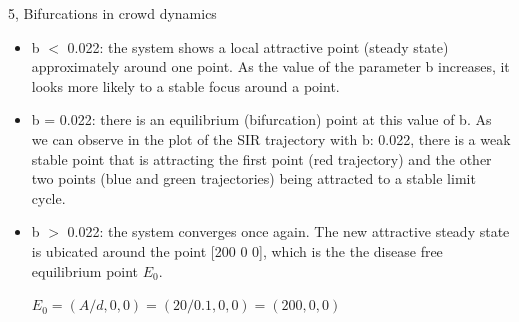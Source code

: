\documentclass[10pt,a4paper]{article}
\begin{document}
\begin{task}{5, Bifurcations in crowd dynamics }
\begin{itemize}
  \item b $<$ 0.022: the system shows a local attractive point (steady state) approximately around one point. As the value of the parameter b increases, it looks more likely to a stable focus around a point.
  \item b = 0.022: there is an equilibrium (bifurcation) point at this value of b. As we can observe in the plot of the SIR trajectory with b: 0.022, there is a weak stable point that is attracting the first point (red trajectory) and the other two points (blue and green trajectories) being attracted to a stable limit cycle.  
  \item b $>$ 0.022: the system converges once again. The new attractive steady state is ubicated around the point [200 0 0], which is the the disease free equilibrium point $E_0$. 
  
  $E_0 = (A/d, 0, 0) = (20/0.1, 0, 0) = (200, 0, 0)$
\end{itemize} 


\end{task}
\end{document}
